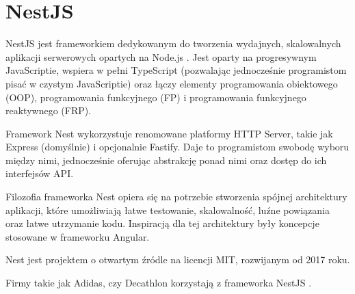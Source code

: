 \section{NestJS}


NestJS jest frameworkiem dedykowanym do tworzenia wydajnych, skalowalnych aplikacji serwerowych opartych na Node.js \cite{nestjsDocumentationNestJS}.
Jest oparty na progresywnym JavaScriptie, wspiera w pełni TypeScript (pozwalając jednocześnie programistom pisać w czystym JavaScriptie) oraz łączy elementy programowania obiektowego (OOP), programowania funkcyjnego (FP) i programowania funkcyjnego reaktywnego (FRP).

Framework Nest wykorzystuje renomowane platformy HTTP Server, takie jak Express (domyślnie) i opcjonalnie Fastify.
Daje to programistom swobodę wyboru między nimi, jednocześnie oferując abstrakcję ponad nimi oraz dostęp do ich interfejsów API.

Filozofia frameworka Nest opiera się na potrzebie stworzenia spójnej architektury aplikacji, które umożliwiają łatwe testowanie, skalowalność, luźne powiązania oraz łatwe utrzymanie kodu.
Inspiracją dla tej architektury były koncepcje stosowane w frameworku Angular.

Nest jest projektem o otwartym źródle na licencji MIT, rozwijanym od 2017 roku.

Firmy takie jak Adidas, czy Decathlon korzystają z frameworka NestJS \cite{reveloHeresHire}.